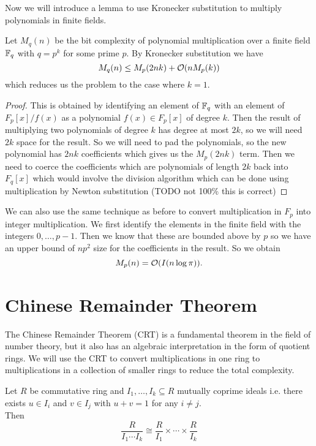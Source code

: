 Now we will introduce a lemma to use Kronecker substitution to multiply polynomials in finite fields.

\begin{lemma}
    Let $M_q(n)$ be the bit complexity of polynomial multiplication over a finite field ${\mathbb F}_q$ with $q = p^k$ for some prime $p$. By Kronecker substitution we have
    \[
        M_q(n) \leq M_p(2nk) + \mathcal O(n M_p(k))
    \]
    which reduces us the problem to the case where $k = 1$.
\end{lemma}

\begin{proof}
    This is obtained by identifying an element of ${\mathbb F}_q$ with an element of $F_p[x]/f(x)$ as a polynomial $f(x) \in F_p[x]$ of degree $k$. Then the result of multiplying two polynomials of degree $k$ has degree at most $2k$, so we will need $2k$ space for the result. So we will need to pad the polynomials, so the new polynomial has $2nk$ coefficients which gives us the $M_p(2nk)$ term. Then we need to coerce the coefficients which are polynomials of length $2k$ back into $F_q[x]$ which would involve the division algorithm which can be done using multiplication by Newton substitution (TODO not 100\% this is correct)

\end{proof}

We can also use the same technique as before to convert multiplication in $F_p$ into integer multiplication. We first identify the elements in the finite field with the integers $0,\ldots, p-1$. Then we know that these are bounded above by $p$ so we have an upper bound of $np^2$ size for the coefficients in the result. So we obtain
\[
    M_p(n) = \mathcal O(I(n \log \pi)).
\]

\section{Chinese Remainder Theorem}%
\label{sec:crt}

The Chinese Remainder Theorem (CRT) is a fundamental theorem in the field of number theory, but it also has an algebraic interpretation in the form of quotient rings. We will use the CRT to convert multiplications in one ring to multiplications in a collection of smaller rings to reduce the total complexity.

\begin{theorem}
    Let $R$ be commutative ring and $I_1, \ldots, I_k \subseteq R$ mutually coprime ideals i.e. there exists $u \in I_i$ and $v \in I_j$ with $u + v = 1$ for any $i \neq j$.\\
    Then
    \[
        \frac{R}{I_1\cdots I_k} \cong \frac{R}{I_1} \times \cdots \times \frac{R}{I_k}
    \]
\end{theorem}

